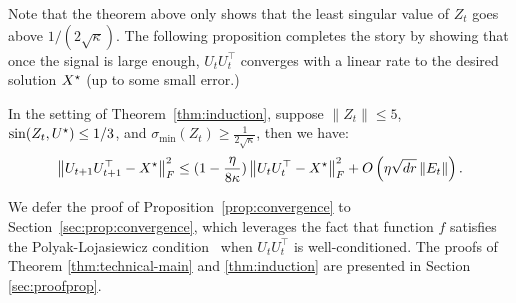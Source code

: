 Note that the theorem above only shows that the least singular value of $Z_t$ goes above $1/(2\sqrt{\kappa})$. The following proposition completes the story by showing that once the signal is large enough, $U_tU_t^\top$ converges with a linear rate to the desired solution ${X}^\star$ (up to some small error.) 


\begin{prop}\label{prop:convergence}
	In the setting of Theorem~\ref{thm:induction}, suppose $\| Z_t \| \leq 5$, $\sin(Z_{t}, {{U}^\star}) \leq 1/3$, and $\sigma_{\min}(Z_t) \geq \frac{1}{2\sqrt{\kappa}}$, then we have:
	\begin{align*}
		\left\|U_{t+1}U_{t+1}^\top- {X}^\star\right\|_F^2 \le (1 - \frac {\eta} {8 \kappa}) \left\|U_{t}U_{t}^\top-{X}^\star\right\|_F^2   +  O\left(\eta \sqrt{dr} \left\|E_t\right\| \right).
	\end{align*}
\end{prop}

\noindent We defer the proof of Proposition~\ref{prop:convergence} to Section~\ref{sec:prop:convergence}, which leverages the fact that function $f$ satisfies the Polyak-Lojasiewicz condition~\cite{polyak1963gradient} when $U_tU_t^\top$ is well-conditioned. The proofs of Theorem \ref{thm:technical-main} and \ref{thm:induction} are presented in Section \ref{sec:proofprop}.
